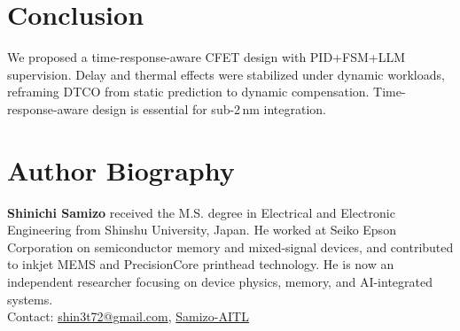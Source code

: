 \documentclass[conference]{IEEEtran}
\begin{document}
\section{Conclusion}
We proposed a time-response-aware CFET design with PID+FSM+LLM supervision. Delay and thermal effects were stabilized under dynamic workloads, reframing DTCO from static prediction to dynamic compensation. Time-response-aware design is essential for sub-2\,nm integration.  




\section*{Author Biography}
\noindent\textbf{Shinichi Samizo} received the M.S. degree in Electrical and Electronic Engineering from Shinshu University, Japan. He worked at Seiko Epson Corporation on semiconductor memory and mixed-signal devices, and contributed to inkjet MEMS and PrecisionCore printhead technology. He is now an independent researcher focusing on device physics, memory, and AI-integrated systems.\\
Contact: \href{mailto:shin3t72@gmail.com}{shin3t72@gmail.com}, \href{https://github.com/Samizo-AITL}{Samizo-AITL}
\end{document}
